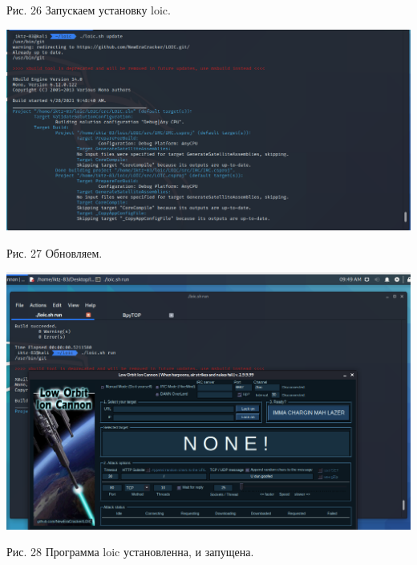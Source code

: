 \documentclass[a4paper,14pt]{extarticle}
\begin{document}
\begin{center}
        Рис. 26 Запускаем установку loic.

        \includegraphics[scale=0.4]{pics/27.png}

        Рис. 27 Обновляем.

        \includegraphics[scale=0.35]{pics/28.png}

        Рис. 28 Программа loic установленна, и запущена. 

    \end{center}
    
\end{document}
